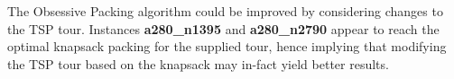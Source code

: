 \documentclass[a4paper,12pt]{article}
\begin{document}
The Obsessive Packing algorithm could be improved by considering changes to the TSP tour. Instances {\bf a280\_n1395} and {\bf a280\_n2790} appear to reach the optimal knapsack packing for the supplied tour, hence implying that modifying the TSP tour based on the knapsack may in-fact yield better results.
\end{document}
